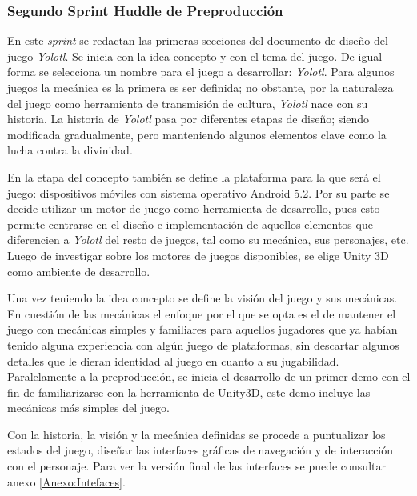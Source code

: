 \subsubsection{Segundo Sprint Huddle de Preproducción}\label{PrePro02}
En este \textit{sprint} se redactan las primeras secciones del documento de diseño del
juego \textit{Yolotl}. Se inicia con la idea concepto y con el tema del juego. De igual
forma se selecciona un nombre para el juego a desarrollar: \textit{Yolotl}.
Para algunos juegos la mecánica es la primera es ser definida; no obstante,
por la naturaleza del juego como herramienta de transmisión de cultura,
\textit{Yolotl} nace con su historia. La historia de \textit{Yolotl} pasa por
diferentes etapas de diseño; siendo modificada gradualmente, pero manteniendo
algunos elementos clave como la lucha contra la divinidad.
\\
\par
En la etapa del concepto también se define la plataforma para la que será
el juego: dispositivos móviles con sistema operativo Android 5.2. Por su parte
se decide utilizar un motor de juego como herramienta de desarrollo, pues esto
permite centrarse en el diseño e implementación de aquellos elementos que
diferencien a \textit{Yolotl} del resto de juegos, tal como su mecánica, sus
personajes, etc. Luego de investigar sobre los motores de juegos disponibles,
se elige Unity 3D como ambiente de desarrollo.
\\
\par
Una vez teniendo la idea concepto se define la visión del juego y sus mecánicas.
En cuestión de las mecánicas el enfoque por el que se opta es el de mantener
el juego con mecánicas simples y familiares para aquellos jugadores que ya habían
tenido alguna experiencia con algún juego de plataformas, sin descartar algunos
detalles que le dieran identidad al juego en cuanto a su jugabilidad. Paralelamente
a la preproducción, se inicia el desarrollo de un primer demo con el fin de
familiarizarse con la herramienta de Unity3D, este demo incluye las mecánicas más
simples del juego.
\\
\par
Con la historia, la visión y la mecánica definidas se procede a puntualizar los
estados del juego, diseñar las interfaces gráficas de navegación y de interacción
con el personaje. Para ver la versión final de las interfaces se puede consultar
anexo \ref{Anexo:Intefaces}.


